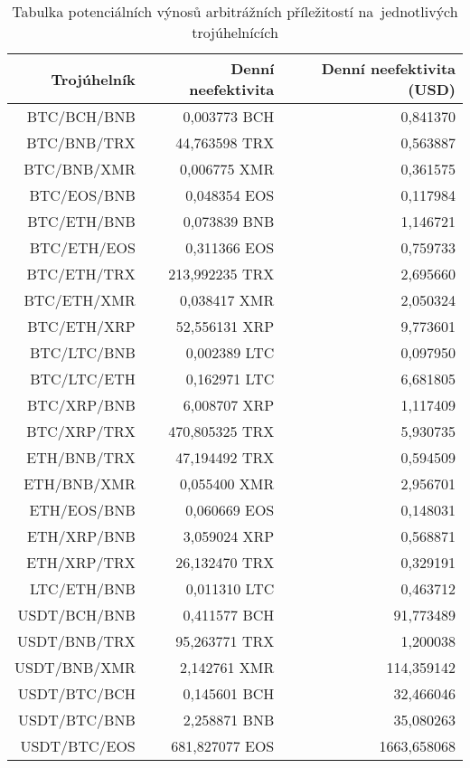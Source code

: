 \begin{table}\centering
\caption{Tabulka potenciálních výnosů arbitrážních příležitostí na~jednotlivých trojúhelnících}
\label{table_gains}
\begin{tabular}{|| r | r | r ||}\hline Trojúhelník & Denní neefektivita & Denní neefektivita (USD)\\ [0.5ex]
 \hline\hline BTC/BCH/BNB & 0,003773 BCH & 0,841370\\ 
 \hline BTC/BNB/TRX & 44,763598 TRX & 0,563887\\ 
 \hline BTC/BNB/XMR & 0,006775 XMR & 0,361575\\ 
 \hline BTC/EOS/BNB & 0,048354 EOS & 0,117984\\ 
 \hline BTC/ETH/BNB & 0,073839 BNB & 1,146721\\ 
 \hline BTC/ETH/EOS & 0,311366 EOS & 0,759733\\ 
 \hline BTC/ETH/TRX & 213,992235 TRX & 2,695660\\ 
 \hline BTC/ETH/XMR & 0,038417 XMR & 2,050324\\ 
 \hline BTC/ETH/XRP & 52,556131 XRP & 9,773601\\ 
 \hline BTC/LTC/BNB & 0,002389 LTC & 0,097950\\ 
 \hline BTC/LTC/ETH & 0,162971 LTC & 6,681805\\ 
 \hline BTC/XRP/BNB & 6,008707 XRP & 1,117409\\ 
 \hline BTC/XRP/TRX & 470,805325 TRX & 5,930735\\ 
 \hline ETH/BNB/TRX & 47,194492 TRX & 0,594509\\ 
 \hline ETH/BNB/XMR & 0,055400 XMR & 2,956701\\ 
 \hline ETH/EOS/BNB & 0,060669 EOS & 0,148031\\ 
 \hline ETH/XRP/BNB & 3,059024 XRP & 0,568871\\ 
 \hline ETH/XRP/TRX & 26,132470 TRX & 0,329191\\ 
 \hline LTC/ETH/BNB & 0,011310 LTC & 0,463712\\ 
 \hline USDT/BCH/BNB & 0,411577 BCH & 91,773489\\ 
 \hline USDT/BNB/TRX & 95,263771 TRX & 1,200038\\ 
 \hline USDT/BNB/XMR & 2,142761 XMR & 114,359142\\ 
 \hline USDT/BTC/BCH & 0,145601 BCH & 32,466046\\ 
 \hline USDT/BTC/BNB & 2,258871 BNB & 35,080263\\ 
 \hline USDT/BTC/EOS & 681,827077 EOS & 1663,658068\\ 

\end{tabular}
\end{table}
